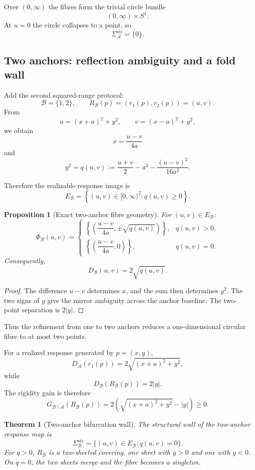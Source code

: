 \documentclass[11pt]{article}
\newtheorem{proposition}[definition]{Proposition}
\newtheorem{theorem}[definition]{Theorem}
\newcommand{\Acal}{\mathcal A}
\newcommand{\Bcal}{\mathcal B}
\begin{document}
Over \((0,\infty)\) the fibres form the trivial circle bundle
\[
(0,\infty)\times S^1.
\]
At \(u=0\) the circle collapses to a point, so
\[
\Sigma_{\Acal}^{\mathrm{str}}=\{0\}.
\]

\subsection{Two anchors: reflection ambiguity and a fold wall}

Add the second squared-range protocol:
\[
\Bcal=\{1,2\},
\qquad
R_{\Bcal}(p)
=
(r_1(p),r_2(p))
=
(u,v).
\]
From
\[
u=(x+a)^2+y^2,
\qquad
v=(x-a)^2+y^2,
\]
we obtain
\[
x=\frac{u-v}{4a}
\]
and
\[
y^2
=
q(u,v)
:=
\frac{u+v}{2}
-a^2
-\frac{(u-v)^2}{16a^2}.
\]

Therefore the realizable response image is
\[
E_{\Bcal}
=
\left\{
(u,v)\in[0,\infty)^2:
q(u,v)\ge0
\right\}.
\]

\begin{proposition}[Exact two-anchor fibre geometry]
For \((u,v)\in E_{\Bcal}\):
\[
\Phi_{\Bcal}(u,v)
=
\begin{cases}
\left\{
\left(\dfrac{u-v}{4a},\pm\sqrt{q(u,v)}\right)
\right\},
&
q(u,v)>0,
\\[10pt]
\left\{
\left(\dfrac{u-v}{4a},0\right)
\right\},
&
q(u,v)=0.
\end{cases}
\]
Consequently,
\[
D_{\Bcal}(u,v)
=
2\sqrt{q(u,v)}.
\]
\end{proposition}

\begin{proof}
The difference \(u-v\) determines \(x\), and the sum then determines \(y^2\).
The two signs of \(y\) give the mirror ambiguity across the anchor baseline.
The two-point separation is \(2|y|\).
\end{proof}

Thus the refinement from one to two anchors reduces a one-dimensional circular
fibre to at most two points.

For a realized response generated by \(p=(x,y)\),
\[
D_{\Acal}(r_1(p))
=
2\sqrt{(x+a)^2+y^2},
\]
while
\[
D_{\Bcal}(R_{\Bcal}(p))
=
2|y|.
\]
The rigidity gain is therefore
\[
G_{\Bcal\mid\Acal}(R_{\Bcal}(p))
=
2\left(
\sqrt{(x+a)^2+y^2}-|y|
\right)
\ge0.
\]

\begin{theorem}[Two-anchor bifurcation wall]
The structural wall of the two-anchor response map is
\[
\Sigma_{\Bcal}^{\mathrm{str}}
=
\{(u,v)\in E_{\Bcal}:q(u,v)=0\}.
\]
For \(q>0\), \(R_{\Bcal}\) is a two-sheeted covering, one sheet with \(y>0\)
and one with \(y<0\). On \(q=0\), the two sheets merge and the fibre becomes
a singleton.
\end{theorem}
\end{document}
